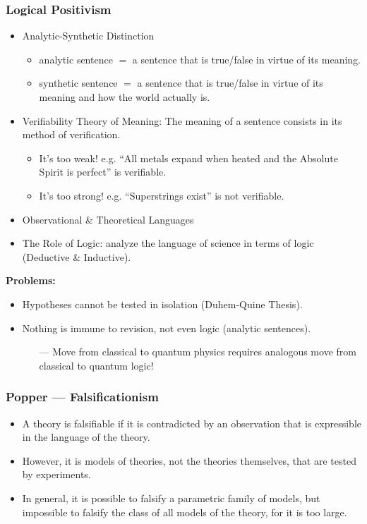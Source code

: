 \documentclass[UTF8,11pt,colorlinks,compress,openany]{beamer}%
\begin{document}
\begin{frame}\frametitle{Logical Positivism}
\begin{itemize}
	\item Analytic-Synthetic Distinction
	\begin{itemize}
		\item analytic sentence $=$ a sentence that is true/false in virtue of its meaning.
		\item synthetic sentence $=$ a sentence that is true/false in virtue of its meaning and how the world actually is.
	\end{itemize}
	\item Verifiability Theory of Meaning: The meaning of a sentence consists in its method of verification.
	\begin{itemize}
		\item It's too weak! e.g. ``All metals expand when heated and the Absolute Spirit is perfect'' is verifiable.
		\item It's too strong! e.g. ``Superstrings exist'' is not verifiable.
	\end{itemize}
	\item Observational \& Theoretical Languages
	\item The Role of Logic: analyze the language of science in terms of logic (Deductive \& Inductive).
\end{itemize}
\textbf{Problems:}
\begin{itemize}
	\item Hypotheses cannot be tested in isolation (Duhem-Quine Thesis).
	\item Nothing is immune to revision, not even logic (analytic sentences).
	\begin{itemize}
		\item[---] Move from classical to quantum physics requires analogous move from classical to quantum logic!
	\end{itemize}
\end{itemize}
\end{frame}

\begin{frame}\frametitle{Popper --- Falsificationism}
\begin{itemize}
	\item A theory is falsifiable if it is contradicted by an observation that is expressible in the language of the theory.
	\item However, it is models of theories, not the theories themselves, that are tested by experiments.
	\item In general, it is possible to falsify a parametric family of models, but impossible to falsify the class of all models of the theory, for it is too large.
\end{itemize}
\end{frame}
\end{document}
